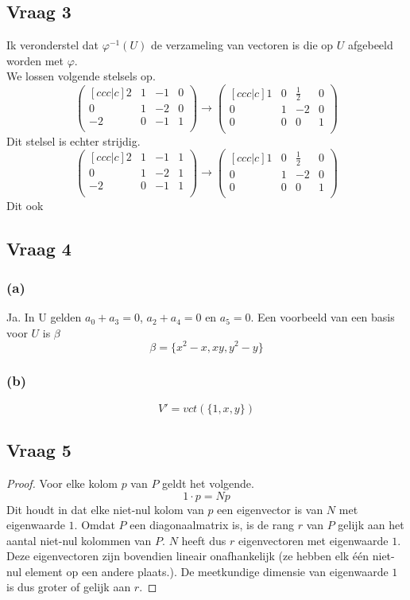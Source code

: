 \documentclass[lineaire_algebra_oplossingen.tex]{subfiles}
\begin{document}
\subsection{Vraag 3}
Ik veronderstel dat $\varphi^{-1}(U)$ de verzameling van vectoren is die op $U$ afgebeeld worden met $\varphi$.\\
We lossen volgende stelsels op.
\[
\begin{pmatrix}[c c c | c]
2 & 1 & -1 & 0\\
0 & 1 & -2 & 0\\
-2 & 0 &-1 & 1\\
\end{pmatrix}
\rightarrow
\begin{pmatrix}[c c c | c]
1 & 0 & \frac{1}{2} & 0\\
0 & 1 & -2 & 0\\
0 & 0 & 0 & 1\\
\end{pmatrix}
\]
Dit stelsel is echter strijdig. %
\[
\begin{pmatrix}[c c c | c]
2 & 1 & -1 & 1\\
0 & 1 & -2 & 1\\
-2 & 0 &-1 & 1\\
\end{pmatrix}
\rightarrow
\begin{pmatrix}[c c c | c]
1 & 0 & \frac{1}{2} & 0\\
0 & 1 & -2 & 0\\
0 & 0 & 0 & 1\\
\end{pmatrix}
\]
Dit ook %


\subsection{Vraag 4}
\subsubsection*{(a)}
Ja. In U gelden $a_0+a_3=0$, $a_2+a_4=0$ en $a_5=0$.
Een voorbeeld van een basis voor $U$ is $\beta$
\[
\beta = \{x^2-x,xy,y^2-y\}
\]

\subsubsection*{(b)}
\[
V' = vct(\{1,x,y\})
\]

\subsection{Vraag 5}
\begin{proof}
Voor elke kolom $p$ van $P$ geldt het volgende. 
\[
1\cdot p = N p
\]
Dit houdt in dat elke niet-nul kolom van $p$ een eigenvector is van $N$ met eigenwaarde $1$.
Omdat $P$ een diagonaalmatrix is, is de rang $r$ van $P$ gelijk aan het aantal niet-nul kolommen van $P$. $N$ heeft dus $r$ eigenvectoren met eigenwaarde $1$. Deze eigenvectoren zijn bovendien lineair onafhankelijk (ze hebben elk \'e\'en niet-nul element op een andere plaats.). De meetkundige dimensie van eigenwaarde $1$ is dus groter of gelijk aan $r$. 
\end{proof}
\end{document}
